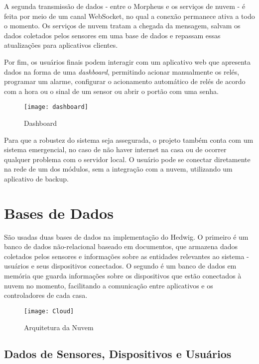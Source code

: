A segunda transmissão de dados - entre o Morpheus e os serviços de nuvem - é feita por meio de um canal WebSocket, no qual a conexão permanece ativa a todo o momento. Os serviços de nuvem tratam a chegada da mensagem, salvam os dados coletados pelos sensores em uma base de dados e repassam essas atualizações para aplicativos clientes.

Por fim, os usuários finais podem interagir com um aplicativo web que apresenta dados na forma de uma \emph{dashboard}, permitindo acionar manualmente os relés, programar um alarme, configurar o acionamento automático de relés de acordo com a hora ou o sinal de um sensor ou abrir o portão com uma senha.

\begin{figure}[H]
	\caption{\label{fig:dashboard}Dashboard}
	\begin{center}
		\texttt{[image: dashboard]}
	\end{center}
\end{figure}

Para que a robustez do sistema seja assegurada, o projeto também conta com um sistema emergencial, no caso de não haver internet na casa ou de ocorrer qualquer problema com o servidor local. O usuário pode se conectar diretamente na rede de um dos módulos, sem a integração com a nuvem, utilizando um aplicativo de backup.

\section{Bases de Dados}

São usadas duas bases de dados na implementação do Hedwig. O primeiro é um banco de dados não-relacional baseado em documentos, que armazena dados coletados pelos sensores e informações sobre as entidades relevantes ao sistema - usuários e seus dispositivos conectados. O segundo é um banco de dados em memória que guarda informações sobre os dispositivos que estão conectados à nuvem no momento, facilitando a comunicação entre aplicativos e os controladores de cada casa.

\begin{figure}[H]
	\caption{\label{fig:Cloud}Arquitetura da Nuvem}
	\begin{center}
		\texttt{[image: Cloud]}
	\end{center}
\end{figure}

\subsection{Dados de Sensores, Dispositivos e Usuários}

